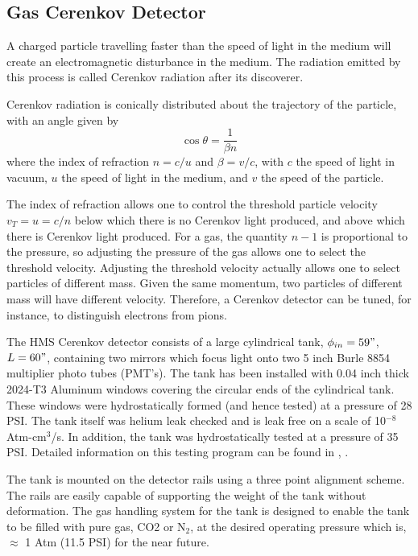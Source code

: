 \subsection{Gas Cerenkov Detector}

A charged particle travelling faster
than the speed of light in the medium will create an electromagnetic
disturbance in the medium. The radiation emitted by this process is
called Cerenkov radiation after its discoverer.

Cerenkov radiation is conically distributed about the trajectory of the
particle, with an angle given by
$$
	\cos{\theta} = \frac{1}{\beta n}
$$
where the index of refraction $n = c/u$ and $\beta = v/c$, with $c$
the speed of light in vacuum, $u$ the speed of light in the medium,
and $v$ the speed of the particle.

The index of refraction allows one to control the threshold particle velocity 
$v_{T}=u=c/n$ below which there is no Cerenkov light produced, and above which there 
is Cerenkov light produced.  For a gas, the quantity $n-1$ is proportional to the pressure, 
so adjusting the pressure of the gas allows one to select the
threshold velocity. Adjusting the threshold velocity actually allows one to select particles of
different mass.  Given the same momentum, two particles of different mass
will have different velocity.  Therefore, a Cerenkov detector can be tuned,
for instance, to distinguish electrons from pions.

	The HMS Cerenkov detector consists of a large cylindrical
tank, $\phi_{in} = 59"$, $L = 60"$, containing two mirrors which focus
light onto two 5 inch Burle 8854 multiplier photo  tubes (PMT's). The tank
has been installed with 0.04 inch thick 2024-T3 Aluminum windows
covering the circular ends of the cylindrical tank. These
windows were hydrostatically formed (and hence tested) at a pressure
of 28 PSI. The tank itself was helium leak checked and is leak free
on a scale of 10$^{-8}$ Atm-cm$^3$/s. In addition, the tank was hydrostatically
tested at a pressure of 35 PSI. Detailed information on this testing
program can be found in \cite {bi:tank}, \cite {bi:wind}.

The tank is mounted on the detector rails using a three point
alignment scheme. The rails are easily capable of supporting the
weight of the tank without deformation.  
The gas handling system for the tank
is designed to enable the tank to be filled with
pure gas, CO2 or N$_2$, at the desired operating
pressure which is, $\approx$ 1 Atm (11.5 PSI) for the near future.

